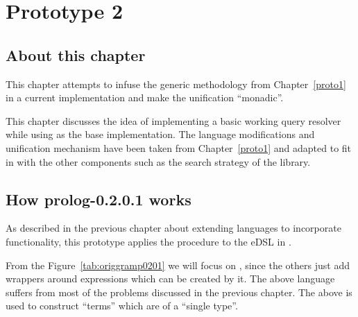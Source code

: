 \documentclass[thesis-solanki.tex]{subfiles}
\begin{document}
\chapter{Prototype 2}{\label{proto2}}

\section{About this chapter}
This chapter attempts to infuse the generic methodology from Chapter~\ref{proto1} in a current 
implementation \cite{prolog-lib} and make the unification ``monadic''.

This chapter discusses the idea of implementing a basic working  query resolver while using
\cite{prolog-lib} as the base implementation.
The language modifications and unification mechanism have been taken from Chapter~\ref{proto1} and adapted to fit
in with the other components such as the search strategy of the library.


\section{How prolog-0.2.0.1 works}

As described in the previous chapter about extending languages to incorporate functionality, this prototype applies
the procedure to the eDSL in \cite{prolog-lib}.

From the Figure~\ref{tab:origgramp0201} we will focus on , since the others just
add wrappers around expressions which can be created by it.
The above language suffers from most of the problems discussed in the previous chapter.
The above is used to construct  ``terms'' which are of a ``single type''.
\end{document}
